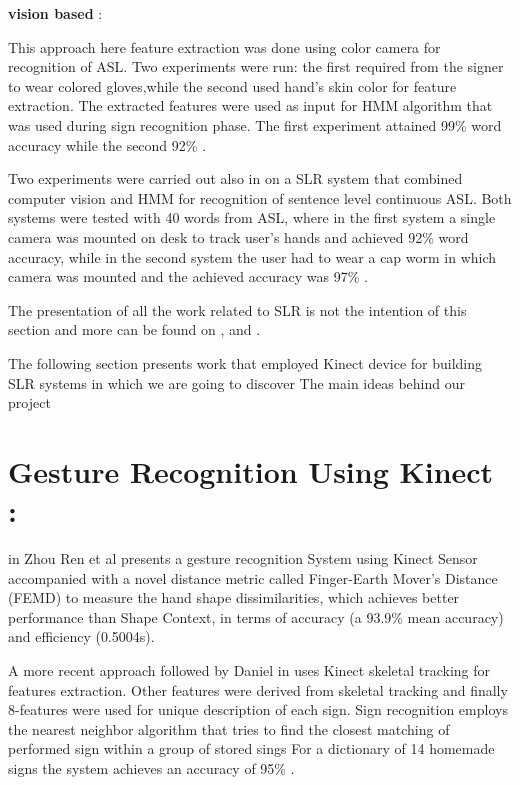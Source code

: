 \textbf{vision based }:

This approach  \cite{32} here  feature extraction was done using color camera for recognition of ASL. Two experiments were run: the first required from the signer to wear colored gloves,while the second used hand’s skin color for feature extraction\cite{32}. The extracted features were used as input for HMM algorithm that was used during sign recognition phase. The first experiment attained 99\% word accuracy while the second 92\%  .
 
Two experiments were carried out also in \cite{33} on a SLR system that combined computer vision and HMM for recognition of sentence level continuous ASL. Both systems were tested with 40 words from ASL, where in the first system a single camera was mounted on desk to track user’s hands and achieved 92\% word accuracy, while in the second system the user had to wear a cap worm in which camera was mounted and the achieved accuracy was 97\%  \cite{33}.



The presentation of all the work related to SLR is not the intention of this section and more can be found on  \cite{27},\cite{36} and \cite{39}. 

The following section presents work that employed Kinect device for building SLR systems in which we are going to discover The main ideas behind our project 

\section{Gesture Recognition Using Kinect :}

in \cite{35} Zhou Ren et al presents a gesture recognition System using Kinect Sensor accompanied with a novel distance metric called Finger-Earth Mover’s Distance (FEMD) to measure the hand shape dissimilarities, which achieves better performance than Shape Context, in terms of accuracy (a 93.9\% mean accuracy) and efficiency (0.5004s). 

A more recent approach followed by Daniel in \cite{47} uses Kinect skeletal tracking for features extraction. Other features were derived from skeletal tracking and finally 8-features were used for unique description of each sign. Sign recognition employs the nearest neighbor algorithm that tries to find the closest matching of performed sign within a group of stored sings  For a dictionary of 14 homemade signs the system achieves an accuracy of 95\% \cite{47} . 

